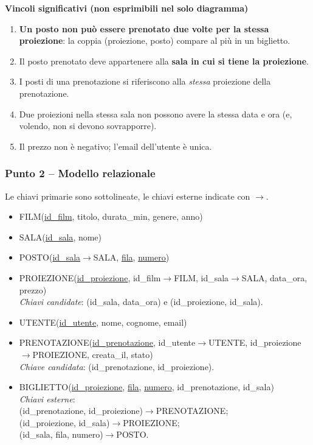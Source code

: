 \textbf{Vincoli significativi (non esprimibili nel solo diagramma)}
\begin{enumerate}
    \item \textbf{Un posto non può essere prenotato due volte per la stessa proiezione}: la coppia (proiezione, posto) compare al più in un biglietto.
    \item Il posto prenotato deve appartenere alla \textbf{sala in cui si tiene la proiezione}.
    \item I posti di una prenotazione si riferiscono alla \emph{stessa} proiezione della prenotazione.
    \item Due proiezioni nella stessa sala non possono avere la stessa data e ora (e, volendo, non si devono sovrapporre).
    \item Il prezzo non è negativo; l'email dell'utente è unica.
\end{enumerate}

\subsubsection*{Punto 2 -- Modello relazionale}
Le chiavi primarie sono sottolineate, le chiavi esterne indicate con $\rightarrow$.

\begin{itemize}
    \item FILM(\underline{id\_film}, titolo, durata\_min, genere, anno)
    \item SALA(\underline{id\_sala}, nome)
    \item POSTO(\underline{id\_sala}$\rightarrow$SALA, \underline{fila}, \underline{numero})
    \item PROIEZIONE(\underline{id\_proiezione}, id\_film$\rightarrow$FILM, id\_sala$\rightarrow$SALA, data\_ora, prezzo)\\
          \emph{Chiavi candidate}: (id\_sala, data\_ora) e (id\_proiezione, id\_sala).
    \item UTENTE(\underline{id\_utente}, nome, cognome, email)
    \item PRENOTAZIONE(\underline{id\_prenotazione}, id\_utente$\rightarrow$UTENTE, id\_proiezione$\rightarrow$PROIEZIONE, creata\_il, stato)\\
          \emph{Chiave candidata}: (id\_prenotazione, id\_proiezione).
    \item BIGLIETTO(\underline{id\_proiezione}, \underline{fila}, \underline{numero}, id\_prenotazione, id\_sala)\\
          \emph{Chiavi esterne}:\\
          (id\_prenotazione, id\_proiezione)$\rightarrow$PRENOTAZIONE;\\
          (id\_proiezione, id\_sala)$\rightarrow$PROIEZIONE;\\
          (id\_sala, fila, numero)$\rightarrow$POSTO.
\end{itemize}

